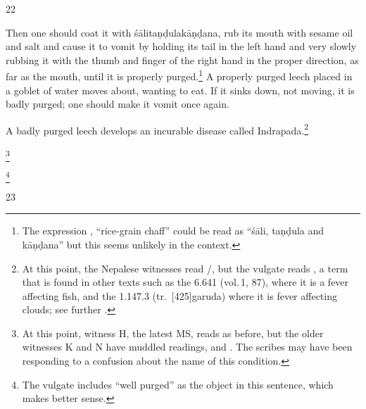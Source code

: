 \begin{translation}
\item[22]

Then one should coat it with \gls{śālitaṇḍulakāṇḍana}, rub its mouth with
sesame oil and salt and cause it to vomit by holding its tail in the left
hand and very slowly rubbing it with the thumb and finger of the right hand
in the proper direction, as far as the mouth, until it is properly purged.\footnote{The 
expression , “rice-grain chaff” could be read as “\gls{śāli}, 
\gls{taṇḍula} and \gls{kāṇḍana}” but this seems unlikely in the context.} 
A properly purged leech placed in a goblet of water moves about, wanting to
eat.  If it sinks down, not moving, it is badly purged; one should make it vomit
once again.  

A badly purged leech develops an incurable disease called 
Indrapada.\footnote{At
    this point, the Nepalese witnesses read /, 
    but the
    vulgate reads , a term that is found in other texts such as 
    the
    \cite{Manasollasa} 6.641 (vol.\,1, 87), where it is a fever affecting fish, and
    the \cite{Garudapurana} 1.147.3 (tr.\ [425]{garuda}) where it is
    fever affecting clouds; see further \cite{broo-inpress}.} 
    
    \begin{sloka}
        
    \footnote{At this point, witness H, the latest MS, reads
     as before, but the older witnesses K and N have muddled
    readings,  and .  The scribes may have 
    been
    responding to a  confusion about the name of this
    condition.}
    \end{sloka}
\footnote{The vulgate
    includes “well purged” as the object in this sentence, which makes better
    sense.}

\item[23]

            

\end{translation}
